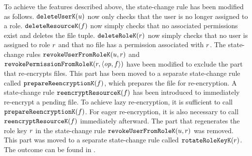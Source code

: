 To achieve the features described above, the state-change rule has been modified as follows. \( \mathtt{deleteUser}\mathtt{K}(u) \) now only checks that the user is no longer assigned to a role. \( \mathtt{deleteResource}\mathtt{K}(f) \) now simply checks that no associated permissions exist and deletes the file tuple. \( \mathtt{deleteRole}\mathtt{K}(r) \) now simply checks that no user is assigned to role \( r \) and that no file has a permission associated with \( r \). The state-change rules \( \mathtt{revokeUserFromRole}\mathtt{K}(u, r) \) and \( \mathtt{revokePermissionFromRole}\mathtt{K}(r, \langle \mathit{op}, f \rangle) \) have been modified to exclude the part that re-encrypts files. This part has been moved to a separate state-change rule called \( \mathtt{prepareReencryption\mathtt{K}}(f) \), which prepares the file for re-encryption. A state-change rule \( \mathtt{reencryptResource\mathtt{K}}(f) \) has been introduced to immediately re-encrypt a pending file. To achieve lazy re-encryption, it is sufficient to call \( \mathtt{prepareReencryption\mathtt{K}}(f) \). For eager re-encryption, it is also necessary to call \( \mathtt{reencryptResource\mathtt{K}}(f) \) immediately afterward. The part that regenerates the role key \( r \) in the state-change rule \( \mathtt{revokeUserFromRole}\mathtt{K}(u, r) \) was removed. This part was moved to a separate state-change rule called \( \mathtt{rotateRoleKey\mathtt{K}}(r) \). The outcome can be found in .


